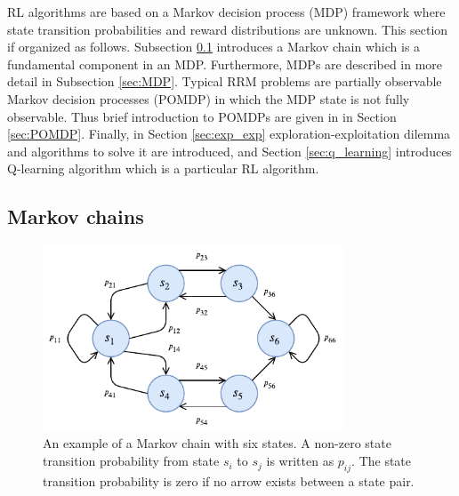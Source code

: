 \documentclass[english, 12pt, a4paper, elec, utf8, a-1b, online]{aaltothesis}
\begin{document}
RL algorithms are based on a Markov decision process (MDP) framework where state transition probabilities and reward distributions are unknown.
This section if organized as follows.
Subsection \ref{sec:MC} introduces a Markov chain which is a fundamental component in an MDP.
Furthermore, MDPs are described in more detail in Subsection \ref{sec:MDP}.
Typical RRM problems are partially observable Markov decision processes (POMDP) in which the MDP state is not fully observable. 
Thus brief introduction to POMDPs are given in in Section \ref{sec:POMDP}.
Finally, in Section \ref{sec:exp_exp} exploration-exploitation dilemma and algorithms to solve it are introduced, and Section \ref{sec:q_learning} introduces Q-learning algorithm which is a particular RL algorithm.


\subsection{Markov chains} \label{sec:MC}

\begin{figure}[b]
    \centering
    \includegraphics[width=0.8\textwidth]{figures/MarkovChain.pdf}
    \caption{
    An example of a Markov chain with six states. 
    A non-zero state transition probability from state $s_i$ to $s_j$ is written as $p_{ij}$.
    The state transition probability is zero if no arrow exists between a state pair. }
    \label{fig:mc}
\end{figure}
\end{document}
